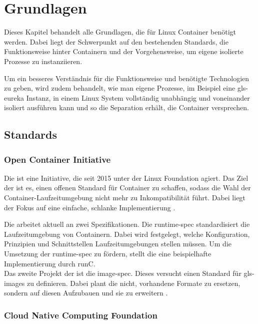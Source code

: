 \chapter{Grundlagen}
\label{chap:grundlagen}
Dieses Kapitel behandelt alle Grundlagen, die für Linux Container benötigt werden. Dabei liegt der Schwerpunkt auf den bestehenden Standards, die Funktionsweise hinter Containern und der Vorgehensweise, um eigene isolierte Prozesse zu instanziieren.

Um ein besseres Verständnis für die Funktionsweise und benötigte Technologien zu geben, wird zudem behandelt, wie man eigene Prozesse, im Beispiel eine \gls{gls-eureka} Instanz, in einem Linux System vollständig unabhängig und voneinander isoliert ausführen kann und so die Separation erhält, die Container versprechen.

\section{Standards}
\label{sec:standards}

\subsection{Open Container Initiative}
\label{sec:oci}
Die \oci ist eine Initiative, die seit 2015 unter der Linux Foundation agiert. Das Ziel der \oci ist es, einen offenen Standard für Container zu schaffen, sodass die Wahl der Container-Laufzeitumgebung nicht mehr zu Inkompatibilität führt. Dabei liegt der Fokus auf eine einfache, schlanke Implementierung \citep{OpenContainerInitiative}.

Die \oci arbeitet aktuell an zwei Spezifikationen. Die runtime-spec standardisiert die Laufzeitumgebung  von Containern. Dabei wird festgelegt, welche Konfiguration, Prinzipien und Schnittstellen Laufzeitumgebungen stellen müssen. Um die Umsetzung der runtime-spec zu fördern, stellt die \oci eine beispielhafte Implementierung durch runC. \\

Das zweite Projekt der \oci ist die image-spec. Dieses versucht einen Standard für \glspl{gls-image} zu definieren. Dabei plant die \oci nicht, vorhandene \Image Formate zu ersetzen, sondern auf diesen Aufzubauen und sie zu erweitern \citep{OpenContainerInitiative}.

\subsection{Cloud Native Computing Foundation}
\label{sec:cncf}

